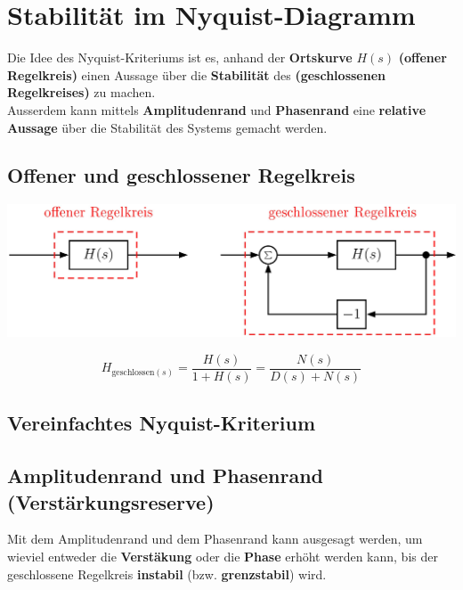 \section{Stabilität im Nyquist-Diagramm}

Die Idee des Nyquist-Kriteriums ist es, anhand der \textbf{Ortskurve} $H(s)$ \textbf{(offener Regelkreis)} einen Aussage über die
\textbf{Stabilität} des \textbf{(geschlossenen Regelkreises)} zu machen. \\
Ausserdem kann mittels \textbf{Amplitudenrand} und \textbf{Phasenrand} eine \textbf{relative Aussage} über die Stabilität
des Systems gemacht werden.


\subsection{Offener und geschlossener Regelkreis}

\includegraphics[width=0.75\columnwidth]{images/offener_geschlossener_regelkreis.png}

$$ H_{\text{geschlossen}(s)} = \frac{H(s)}{1 + H(s)} = \frac{N(s)}{D(s) + N(s)} $$


\subsection{Vereinfachtes Nyquist-Kriterium}



\subsection{Amplitudenrand und Phasenrand (Verstärkungsreserve)}

Mit dem Amplitudenrand und dem Phasenrand kann ausgesagt werden, um wieviel entweder die \textbf{Verstäkung} oder die \textbf{Phase}
erhöht werden kann, bis der geschlossene Regelkreis \textbf{instabil} (bzw. \textbf{grenzstabil}) wird.

